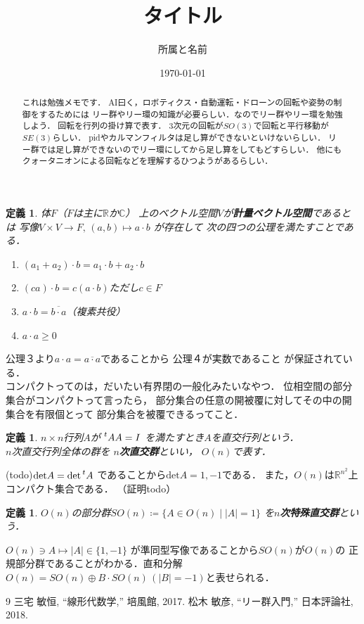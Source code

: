 \documentclass[dvipdfmx,a4paper,12pt]{jsarticle}
\title{タイトル}
\author{所属と名前}
\date{\today}
\newtheorem{definition}[theorem]{定義}
\begin{document}
\begin{abstract}
    これは勉強メモです．
    AI曰く，ロボティクス・自動運転・ドローンの回転や姿勢の制御をするためには
    リー群やリー環の知識が必要らしい．なのでリー群やリー環を勉強しよう．
    回転を行列の掛け算で表す．
    $3$次元の回転が$SO(3)$で回転と平行移動が$SE(3)$らしい．
    pidやカルマンフィルタは足し算ができないといけないらしい．
    リー群では足し算ができないのでリー環にしてから足し算をしてもどすらしい．
    他にもクォータニオンによる回転などを理解するひつようがあるらしい．
\end{abstract}
\begin{definition}
    体$F$（$F$は主に$\mathbb{R}$か$\mathbb{C}$）
    上のベクトル空間$V$が\textbf{計量ベクトル空間}であるとは
    写像$V\times V\rightarrow F,\,(a,b)\mapsto a\cdot b$
    が存在して
    次の四つの公理を満たすことである．
    \begin{enumerate}
        \item $(a_1+a_2)\cdot b=a_1\cdot b+a_2\cdot b$
        \item $(ca)\cdot b=c(a\cdot b)$ただし$c\in F$
        \item $a\cdot b=\overline{b\cdot a}$（複素共役）
        \item $a\cdot a \geq 0$
    \end{enumerate}
\end{definition}
公理３より$a\cdot a=\overline{a\cdot a}$であることから
公理４が実数であること
が保証されている．
\\
コンパクトってのは，だいたい有界閉の一般化みたいなやつ．
位相空間の部分集合がコンパクトって言ったら，
部分集合の任意の開被覆に対してその中の開集合を有限個とって
部分集合を被覆できるってこと．
\begin{definition}
    $n\times n$行列$A$が
    $\prescript{t}{}{A}A=I$
    を満たすとき$A$を直交行列という．\\
    $n$次直交行列全体の群を
    \textbf{$n$次直交群}といい，
    $O(n)$で表す．
\end{definition}
(todo)$\mathrm{det}A=\mathrm{det}\prescript{t}{}{A}$
であることから$\mathrm{det}A=1,-1$である．
また，$O(n)$は$\mathbb{R}^{n^2}$上コンパクト集合である．
（証明todo）

\begin{definition}
    $O(n)$の部分群$SO(n)\coloneqq \{A\in O(n)\mid |A|=1\}$
    を\textbf{$n$次特殊直交群}という．
\end{definition}

$O(n)\ni A\mapsto |A|\in \{1,-1\}$
が準同型写像であることから$SO(n)$が$O(n)$の
正規部分群であることがわかる．直和分解
$O(n)=SO(n)\oplus B\cdot SO(n)\,(|B|=-1)$と表せられる．



\begin{thebibliography}{9}
     三宅 敏恒, ``線形代数学,'' 培風館, 2017.
     松木 敏彦, ``リー群入門,'' 日本評論社, 2018.
\end{thebibliography}
\end{document}
